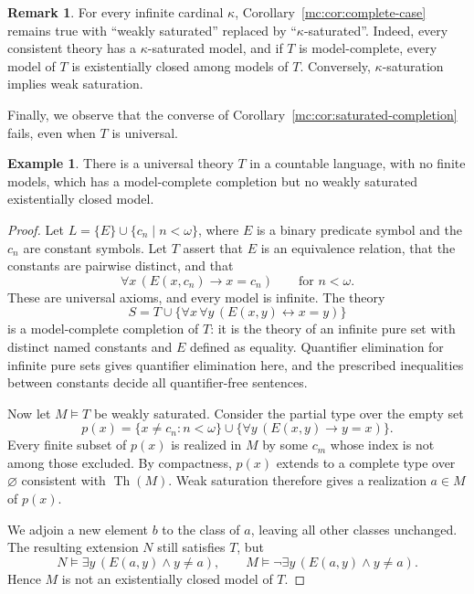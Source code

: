 \documentclass[10pt,a4paper]{amsart}
\theoremstyle{definition}
\newtheorem{example}[theorem]{Example}
\newtheorem{remark}[theorem]{Remark}
\DeclareMathOperator{\Th}{Th}
\begin{document}
\begin{remark}
For every infinite cardinal $\kappa$,
Corollary~\ref{mc:cor:complete-case} remains true with
``weakly saturated'' replaced by ``$\kappa$-saturated''.
Indeed, every consistent theory has a $\kappa$-saturated model,
and if $T$ is model-complete, every model of $T$ is existentially
closed among models of $T$. Conversely, $\kappa$-saturation
implies weak saturation.
\end{remark}

Finally, we observe that the converse of Corollary~\ref{mc:cor:saturated-completion}
fails, even when $T$ is universal.

\begin{example}\label{mc:ex:universal}
There is a universal theory $T$ in a countable language,
with no finite models, which has a model-complete completion
but no weakly saturated existentially closed model.
\end{example}

\begin{proof}
Let $L=\{E\}\cup\{c_n\mid n<\omega\}$, where $E$ is a binary predicate symbol and
the $c_n$ are constant symbols. Let $T$ assert that $E$ is an equivalence
relation, that the constants are pairwise distinct, and that
\[
  \forall x\,(E(x,c_n)\longrightarrow x=c_n)
  \qquad \text{for $n<\omega $}.
\]
These are universal axioms, and every model is infinite. The theory
\[
  S=T\cup\{\forall x\,\forall y\,
                  (E(x,y)\leftrightarrow x=y)\}
\]
is a model-complete completion of $T$: it is the theory of an
infinite pure set with distinct named constants and $E$ defined
as equality. Quantifier elimination for infinite pure sets gives
quantifier elimination here, and the prescribed inequalities
between constants decide all quantifier-free sentences.

Now let $M\models T$ be weakly saturated. Consider the
partial type over the empty set
\[
  p(x)=\{x\neq c_n:n<\omega\}
       \cup\{\forall y\,(E(x,y)\longrightarrow y=x)\}.
\]
Every finite subset of $p(x)$ is realized in $M$ by some
$c_m$ whose index is not among those excluded.
By compactness, $p(x)$ extends to a complete type over
$\varnothing$ consistent with $\Th(M)$.
Weak saturation therefore gives a realization $a\in M$
of $p(x)$.

We adjoin a new element $b$ to the class of $a$, leaving all other
classes unchanged. The resulting extension $N$ still
satisfies $T$, but
\[
  N\models\exists y\,(E(a,y)\land y\neq a),
  \qquad
  M\models\neg\exists y\,(E(a,y)\land y\neq a).
\]
Hence $M$ is not an existentially closed model of $T$.
\end{proof}
\end{document}
